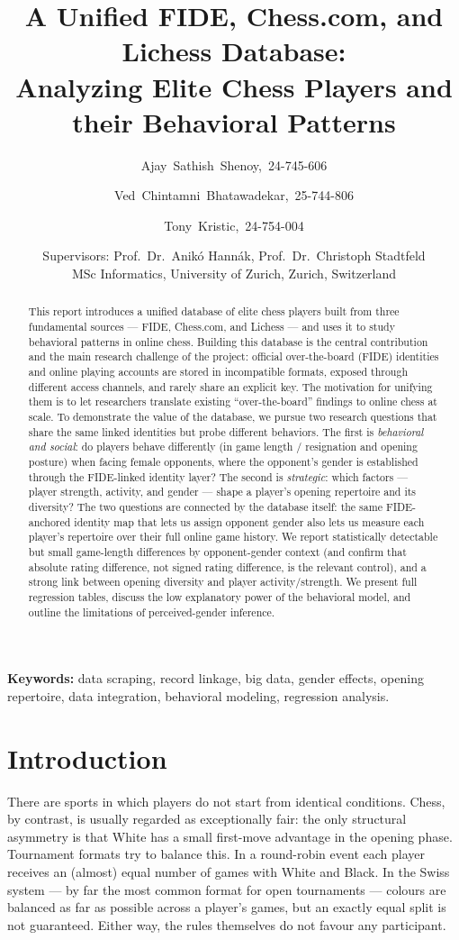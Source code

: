 \documentclass[11pt,a4paper]{article}
\title{A Unified FIDE, Chess.com, and Lichess Database:\\
Analyzing Elite Chess Players and their Behavioral Patterns}
\author{%
Ajay~Sathish~Shenoy,~24-745-606 \and
Ved~Chintamni~Bhatawadekar,~25-744-806 \and
Tony~Kristic,~24-754-004%
}
\date{%
Supervisors: Prof.\ Dr.\ Anik\'o Hann\'ak, Prof.\ Dr.\ Christoph Stadtfeld\\[2pt]
MSc Informatics, University of Zurich, Zurich, Switzerland}
\begin{document}
\maketitle

\begin{abstract}
This report introduces a unified database of elite chess players built from three
fundamental sources --- FIDE, Chess.com, and Lichess --- and uses it to study behavioral
patterns in online chess. Building this database is the central contribution and the main
research challenge of the project: official over-the-board (FIDE) identities and online
playing accounts are stored in incompatible formats, exposed through different access
channels, and rarely share an explicit key. The motivation for unifying them is to let
researchers translate existing ``over-the-board'' findings to online chess at scale. To
demonstrate the value of the database, we pursue two research questions that share the
same linked identities but probe different behaviors. The first is \emph{behavioral and
social}: do players behave differently (in game length / resignation and opening posture)
when facing female opponents, where the opponent's gender is established through the
FIDE-linked identity layer? The second is \emph{strategic}: which factors --- player
strength, activity, and gender --- shape a player's opening repertoire and its diversity?
The two questions are connected by the database itself: the same FIDE-anchored identity
map that lets us assign opponent gender also lets us measure each player's repertoire over
their full online game history. We report statistically detectable but small game-length
differences by opponent-gender context (and confirm that absolute rating difference, not
signed rating difference, is the relevant control), and a strong link between opening
diversity and player activity/strength. We present full regression tables, discuss the low
explanatory power of the behavioral model, and outline the limitations of perceived-gender
inference.
\end{abstract}

\noindent\textbf{Keywords:} data scraping, record linkage, big data, gender effects,
opening repertoire, data integration, behavioral modeling, regression analysis.

\section{Introduction}
There are sports in which players do not start from identical conditions. Chess, by
contrast, is usually regarded as exceptionally fair: the only structural asymmetry is that
White has a small first-move advantage in the opening phase. Tournament formats try to
balance this. In a round-robin event each player receives an (almost) equal number of games
with White and Black. In the Swiss system --- by far the most common format for open
tournaments --- colours are balanced as far as possible across a player's games, but an
exactly equal split is not guaranteed. Either way, the rules themselves do not favour any
participant.
\end{document}
